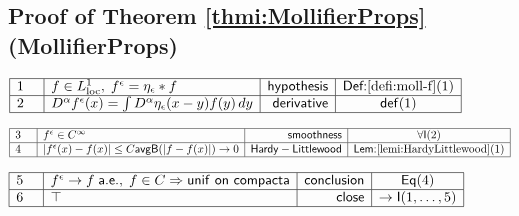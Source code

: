 \documentclass[11pt,reqno]{amsart}
\begin{document}
	\subsection*{Proof of Theorem \protect\ref{thmi:MollifierProps} (\textsf{MollifierProps})}
	\noindent$\begin{array}{|m{0.5cm}|l|r|c|}
	\hline
	1 & f\in L^{1}_{\mathrm{loc}},\;f^{\epsilon}=\eta_{\epsilon}*f & \mathsf{hypothesis} & \textsf{Def:}\ref{defi:moll-f}(1) \\ \hline
	2 & D^{\alpha}f^{\epsilon}(x)=\int D^{\alpha}\eta_{\epsilon}(x-y)f(y)\,dy & \mathsf{derivative} & \mathsf{def}(1) \\ \hline
	\end{array}$
	\par\nointerlineskip\noindent$\begin{array}{|m{0.5cm}|l|r|c|}
	\hline
	3 & f^{\epsilon}\in C^{\infty} & \mathsf{smoothness} & \forall\mathsf{I}(2) \\ \hline
	4 & |f^{\epsilon}(x)-f(x)|\le C\mathsf{avgB}(|f-f(x)|)\to0 & \mathsf{Hardy-Littlewood} & \textsf{Lem:}\ref{lemi:HardyLittlewood}(1) \\ \hline
	\end{array}$
	\par\nointerlineskip\noindent$\begin{array}{|m{0.5cm}|l|r|c|}
	\hline
	5 & f^{\epsilon}\to f\;\mathsf{a.e.},\;f\in C\Rightarrow\mathsf{unif\ on\ compacta} & \mathsf{conclusion} & \mathsf{Eq}(4) \\ \hline
	6 & \top & \mathsf{close} & \to\mathsf{I}(1,\dots,5) \\ \hline
	\end{array}$
	\medskip
	
\end{document}
